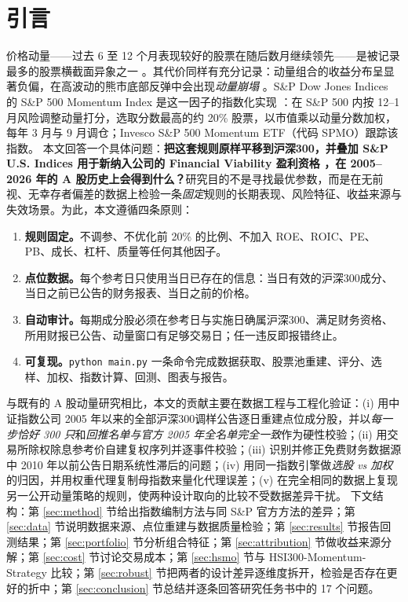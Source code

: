 \documentclass[11pt,a4paper]{article}
\begin{document}
\section{引言}
价格动量——过去 6 至 12 个月表现较好的股票在随后数月继续领先——是被记录最多的股票横截面异象之一 \cite{jegadeesh1993,asness2013,carhart1997}。其代价同样有充分记录：动量组合的收益分布呈显著负偏，在高波动的熊市底部反弹中会出现\emph{动量崩塌} \cite{daniel2016,barroso2015}。S\&P Dow Jones Indices 的 S\&P 500 Momentum Index 是这一因子的指数化实现 \cite{spdji_momentum}：在 S\&P 500 内按 12--1 月风险调整动量打分，选取分数最高的约 20\% 股票，以市值乘以动量分数加权，每年 3 月与 9 月调仓；Invesco S\&P 500 Momentum ETF（代码 SPMO）跟踪该指数。
本文回答一个具体问题：\textbf{把这套规则原样平移到沪深300，并叠加 S\&P U.S. Indices 用于新纳入公司的 Financial Viability 盈利资格 \cite{spdji_us}，在 2005--2026 年的 A 股历史上会得到什么？}研究目的不是寻找最优参数，而是在无前视、无幸存者偏差的数据上检验一条\emph{固定}规则的长期表现、风险特征、收益来源与失效场景。为此，本文遵循四条原则：
\begin{enumerate}
\item \textbf{规则固定。}不调参、不优化前 20\% 的比例、不加入 ROE、ROIC、PE、PB、成长、杠杆、质量等任何其他因子。
\item \textbf{点位数据。}每个参考日只使用当日已存在的信息：当日有效的沪深300成分、当日之前已公告的财务报表、当日之前的价格。
\item \textbf{自动审计。}每期成分股必须在参考日与实施日确属沪深300、满足财务资格、所用财报已公告、动量窗口有足够交易日；任一违反即报错终止。
\item \textbf{可复现。}\texttt{python main.py} 一条命令完成数据获取、股票池重建、评分、选样、加权、指数计算、回测、图表与报告。
\end{enumerate}
与既有的 A 股动量研究相比，本文的贡献主要在数据工程与工程化验证：(i) 用中证指数公司 2005 年以来的全部沪深300调样公告逐日重建点位成分股，并以\emph{每一步恰好 300 只}和\emph{回推名单与官方 2005 年全名单完全一致}作为硬性校验；(ii) 用交易所除权除息参考价自建复权序列并逐事件校验；(iii) 识别并修正免费财务数据源中 2010 年以前公告日期系统性滞后的问题；(iv) 用同一指数引擎做\emph{选股 vs 加权}的归因，并用权重代理复制母指数来量化代理误差；(v) 在完全相同的数据上复现另一公开动量策略的规则，使两种设计取向的比较不受数据差异干扰。
下文结构：第 \ref{sec:method} 节给出指数编制方法与同 S\&P 官方方法的差异；第 \ref{sec:data} 节说明数据来源、点位重建与数据质量检验；第 \ref{sec:results} 节报告回测结果；第 \ref{sec:portfolio} 节分析组合特征；第 \ref{sec:attribution} 节做收益来源分解；第 \ref{sec:cost} 节讨论交易成本；第 \ref{sec:hsmo} 节与 HSI300-Momentum-Strategy 比较；第 \ref{sec:robust} 节把两者的设计差异逐维度拆开，检验是否存在更好的折中；第 \ref{sec:conclusion} 节总结并逐条回答研究任务书中的 17 个问题。
\end{document}
